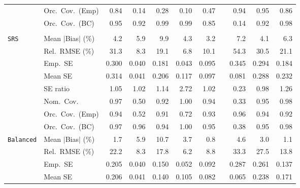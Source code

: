 \begin{landscape}
\begin{longtable}{llrrrrrrrrr}
 & Orc.\ Cov.\ (Emp) & 0.84 & 0.14 & 0.28 & 0.10 & 0.47 &  & \cellcolor{ranktwo}0.94 & \cellcolor{rankone}0.95 & \cellcolor{rankthree}0.86 \\
 & Orc.\ Cov.\ (BC) & \cellcolor{rankone}0.95 & \cellcolor{ranktwo}0.92 & \cellcolor{rankthree}0.99 & \cellcolor{rankthree}0.99 & 0.85 &  & 0.14 & \cellcolor{ranktwo}0.92 & \cellcolor{ranktwo}0.98 \\
\addlinespace[2pt]
\multicolumn{11}{l}{\textbf{Binary \& Categorical Phase-Two Covariates}} \\
\addlinespace[2pt]
\quad \texttt{SRS} & Mean $|$Bias$|$ (\%) & \cellcolor{rankthree}4.2 & 5.9 & 9.9 & 4.3 & \cellcolor{rankone}3.2 &  & 7.2 & \cellcolor{ranktwo}4.1 & 6.3 \\
 & Rel.\ RMSE (\%) & 31.3 & \cellcolor{ranktwo}8.3 & 19.1 & \cellcolor{rankone}6.8 & \cellcolor{rankthree}10.1 &  & 54.3 & 30.5 & 21.1 \\
 & Emp.\ SE & 0.300 & 0.040 & 0.181 & 0.043 & 0.095 &  & 0.345 & 0.294 & 0.184 \\
 & Mean SE & 0.314 & 0.041 & 0.206 & 0.117 & 0.097 &  & 0.081 & 0.288 & 0.232 \\
 & SE ratio & \cellcolor{ranktwo}1.05 & \cellcolor{rankone}1.02 & \cellcolor{rankthree}1.14 & 2.72 & \cellcolor{rankone}1.02 &  & 0.23 & \cellcolor{rankone}0.98 & 1.26 \\
 & Nom.\ Cov. & \cellcolor{rankthree}0.97 & 0.50 & 0.92 & 1.00 & \cellcolor{ranktwo}0.94 &  & 0.33 & \cellcolor{rankone}0.95 & 0.98 \\
 & Orc.\ Cov.\ (Emp) & \cellcolor{rankone}0.94 & 0.52 & 0.91 & 0.72 & \cellcolor{ranktwo}0.93 &  & \cellcolor{rankone}0.96 & \cellcolor{rankone}0.94 & \cellcolor{rankthree}0.92 \\
 & Orc.\ Cov.\ (BC) & \cellcolor{rankthree}0.97 & \cellcolor{ranktwo}0.96 & \cellcolor{ranktwo}0.94 & 1.00 & \cellcolor{rankone}0.95 &  & 0.38 & \cellcolor{rankone}0.95 & 0.98 \\
\addlinespace[2pt]
\quad \texttt{Balanced} & Mean $|$Bias$|$ (\%) & \cellcolor{rankthree}1.7 & 5.9 & 10.7 & 3.7 & \cellcolor{rankone}0.8 &  & 4.6 & 3.0 & \cellcolor{ranktwo}1.1 \\
 & Rel.\ RMSE (\%) & 22.2 & \cellcolor{ranktwo}8.3 & 17.8 & \cellcolor{rankone}6.2 & \cellcolor{rankthree}8.8 &  & 33.3 & 27.5 & 13.8 \\
 & Emp.\ SE & 0.205 & 0.040 & 0.150 & 0.052 & 0.092 &  & 0.287 & 0.261 & 0.137 \\
 & Mean SE & 0.206 & 0.041 & 0.140 & 0.105 & 0.082 &  & 0.065 & 0.238 & 0.171 \\

\end{longtable}
\end{landscape}
